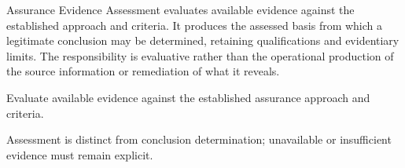 Assurance Evidence Assessment evaluates available evidence against the established approach and criteria. It produces the assessed basis from which a legitimate conclusion may be determined, retaining qualifications and evidentiary limits. The responsibility is evaluative rather than the operational production of the source information or remediation of what it reveals.



Evaluate available evidence against the established assurance approach and criteria.



Assessment is distinct from conclusion determination; unavailable or insufficient evidence must remain explicit.


